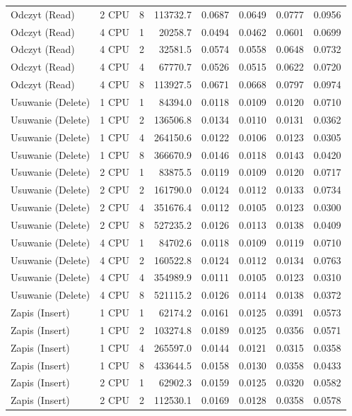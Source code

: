 \begin{table}[ht]
{\begin{tabular}{llcrrrrr}
Odczyt (Read) & 2 CPU & 8 & 113732.7 & 0.0687 & 0.0649 & 0.0777 & 0.0956 \\
Odczyt (Read) & 4 CPU & 1 & 20258.7 & 0.0494 & 0.0462 & 0.0601 & 0.0699 \\
Odczyt (Read) & 4 CPU & 2 & 32581.5 & 0.0574 & 0.0558 & 0.0648 & 0.0732 \\
Odczyt (Read) & 4 CPU & 4 & 67770.7 & 0.0526 & 0.0515 & 0.0622 & 0.0720 \\
Odczyt (Read) & 4 CPU & 8 & 113927.5 & 0.0671 & 0.0668 & 0.0797 & 0.0974 \\
Usuwanie (Delete) & 1 CPU & 1 & 84394.0 & 0.0118 & 0.0109 & 0.0120 & 0.0710 \\
Usuwanie (Delete) & 1 CPU & 2 & 136506.8 & 0.0134 & 0.0110 & 0.0131 & 0.0362 \\
Usuwanie (Delete) & 1 CPU & 4 & 264150.6 & 0.0122 & 0.0106 & 0.0123 & 0.0305 \\
Usuwanie (Delete) & 1 CPU & 8 & 366670.9 & 0.0146 & 0.0118 & 0.0143 & 0.0420 \\
Usuwanie (Delete) & 2 CPU & 1 & 83875.5 & 0.0119 & 0.0109 & 0.0120 & 0.0717 \\
Usuwanie (Delete) & 2 CPU & 2 & 161790.0 & 0.0124 & 0.0112 & 0.0133 & 0.0734 \\
Usuwanie (Delete) & 2 CPU & 4 & 351676.4 & 0.0112 & 0.0105 & 0.0123 & 0.0300 \\
Usuwanie (Delete) & 2 CPU & 8 & 527235.2 & 0.0126 & 0.0113 & 0.0138 & 0.0409 \\
Usuwanie (Delete) & 4 CPU & 1 & 84702.6 & 0.0118 & 0.0109 & 0.0119 & 0.0710 \\
Usuwanie (Delete) & 4 CPU & 2 & 160522.8 & 0.0124 & 0.0112 & 0.0134 & 0.0763 \\
Usuwanie (Delete) & 4 CPU & 4 & 354989.9 & 0.0111 & 0.0105 & 0.0123 & 0.0310 \\
Usuwanie (Delete) & 4 CPU & 8 & 521115.2 & 0.0126 & 0.0114 & 0.0138 & 0.0372 \\
Zapis (Insert) & 1 CPU & 1 & 62174.2 & 0.0161 & 0.0125 & 0.0391 & 0.0573 \\
Zapis (Insert) & 1 CPU & 2 & 103274.8 & 0.0189 & 0.0125 & 0.0356 & 0.0571 \\
Zapis (Insert) & 1 CPU & 4 & 265597.0 & 0.0144 & 0.0121 & 0.0315 & 0.0358 \\
Zapis (Insert) & 1 CPU & 8 & 433644.5 & 0.0158 & 0.0130 & 0.0358 & 0.0433 \\
Zapis (Insert) & 2 CPU & 1 & 62902.3 & 0.0159 & 0.0125 & 0.0320 & 0.0582 \\
Zapis (Insert) & 2 CPU & 2 & 112530.1 & 0.0169 & 0.0128 & 0.0358 & 0.0578 \\

\end{tabular}}
\end{table}
